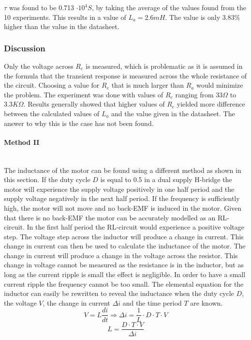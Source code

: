 $\tau$ was found to be 0.713 $\cdot 10^4 S$, by taking the average of the values found from the 10 experiments. 
This results in a value of $L_a=2.6mH$.
The value is only $3.83\%$ higher than the value in the datasheet.

\subsubsection{Discussion}
Only the voltage across $R_e$ is measured, which is problematic as it is assumed in the formula that the transient response is measured across the whole resistance of the circuit. Choosing a value for $R_e$ that is much larger than $R_a$ would minimize the problem.
The experiment was done with values of $R_e$ ranging from $33\Omega$ to $3.3K\Omega$.
Results generally showed that higher values of $R_e$ yielded more difference between the calculated values of $L_a$ and the value given in the datasheet.	
The answer to why this is the case has not been found.


\paragraph{Method II}~\\
The inductance of the motor can be found using a different method as shown in this section. 
If the duty cycle $D$ is equal to 0.5 in a dual supply H-bridge the motor will experience the supply voltage positively in one half period and the supply voltage negatively in the next half period.
If the frequency is sufficiently high, the motor will not move and no back-EMF is induced in the motor. 
Given that there is no back-EMF the motor can be accurately modelled as an RL-circuit.  
In the first half period the RL-circuit would experience a positive voltage step. 
The voltage step across the inductor will produce a change in current.
This change in current can then be used to calculate the inductance of the motor.
The change in current will produce a change in the voltage across the resistor.
This change in voltage cannot be measured as the resistance is in the inductor, but as long as the current ripple is small the effect is negligible. 
In order to have a small current ripple the frequency cannot be too small.   
The elemental equation for the inductor can easily be rewritten to reveal the inductance when the duty cycle $D$, the voltage $V$, the change in current $\Delta i$ and the time period $T$ are known. 
$$V = L \frac{di}{dt} \Rightarrow \Delta i = \frac{1}{L} \cdot D \cdot T \cdot V $$
$$L = \frac{D \cdot T \cdot V}{\Delta i}$$


